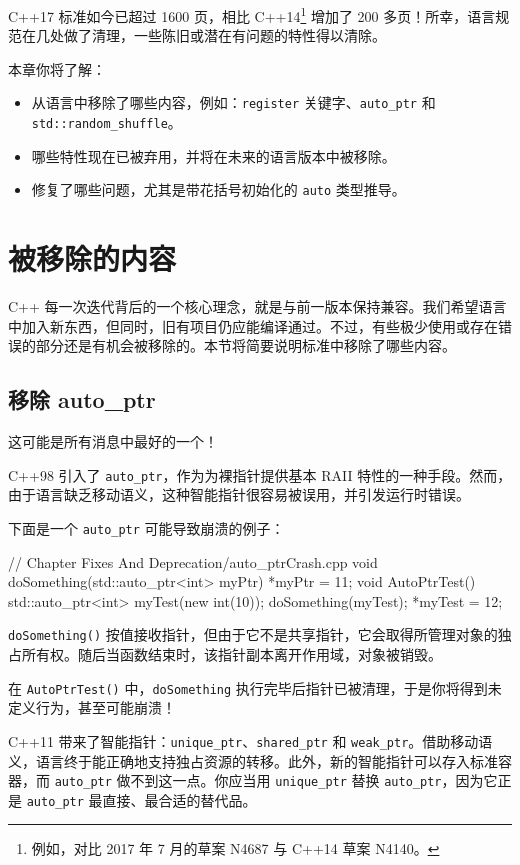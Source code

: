 C++17 标准如今已超过 1600 页，相比 C++14\footnote{例如，对比 2017 年 7 月的草案 N4687 与 C++14 草案 N4140。} 增加了 200 多页！所幸，语言规范在几处做了清理，一些陈旧或潜在有问题的特性得以清除。

本章你将了解：
\begin{itemize}
\item 从语言中移除了哪些内容，例如：\texttt{register} 关键字、\texttt{auto\_ptr} 和 \texttt{std::random\_shuffle}。
\item 哪些特性现在已被弃用，并将在未来的语言版本中被移除。
\item 修复了哪些问题，尤其是带花括号初始化的 \texttt{auto} 类型推导。
\end{itemize}

\section{被移除的内容}

C++ 每一次迭代背后的一个核心理念，就是与前一版本保持兼容。我们希望语言中加入新东西，但同时，旧有项目仍应能编译通过。不过，有些极少使用或存在错误的部分还是有机会被移除的。本节将简要说明标准中移除了哪些内容。

\subsection{移除 auto\_ptr}

这可能是所有消息中最好的一个！

C++98 引入了 \texttt{auto\_ptr}，作为为裸指针提供基本 RAII 特性的一种手段。然而，由于语言缺乏移动语义，这种智能指针很容易被误用，并引发运行时错误。

下面是一个 \texttt{auto\_ptr} 可能导致崩溃的例子：

\begin{codebox}[cpp]
// Chapter Fixes And Deprecation/auto_ptrCrash.cpp
void doSomething(std::auto_ptr<int> myPtr)
{
*myPtr = 11;
}
void AutoPtrTest() {
std::auto_ptr<int> myTest(new int(10));
doSomething(myTest);
*myTest = 12;
}
\end{codebox}

\texttt{doSomething()} 按值接收指针，但由于它不是共享指针，它会取得所管理对象的独占所有权。随后当函数结束时，该指针副本离开作用域，对象被销毁。

在 \texttt{AutoPtrTest()} 中，\texttt{doSomething} 执行完毕后指针已被清理，于是你将得到未定义行为，甚至可能崩溃！

C++11 带来了智能指针：\texttt{unique\_ptr}、\texttt{shared\_ptr} 和 \texttt{weak\_ptr}。借助移动语义，语言终于能正确地支持独占资源的转移。此外，新的智能指针可以存入标准容器，而 \texttt{auto\_ptr} 做不到这一点。你应当用 \texttt{unique\_ptr} 替换 \texttt{auto\_ptr}，因为它正是 \texttt{auto\_ptr} 最直接、最合适的替代品。

